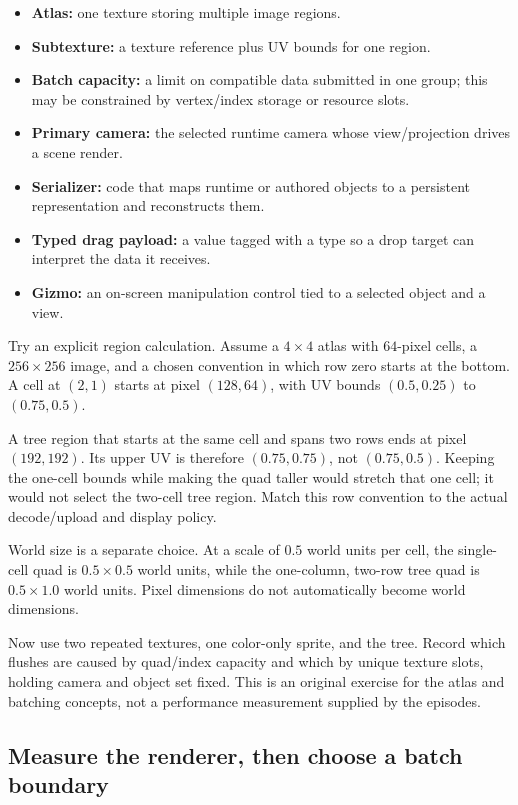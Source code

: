 \begin{itemize}
\tightlist
\item
  \textbf{Atlas:} one texture storing multiple image regions.
\item
  \textbf{Subtexture:} a texture reference plus UV bounds for one region.
\item
  \textbf{Batch capacity:} a limit on compatible data submitted in one group; this may be constrained by vertex/index storage or resource slots.
\item
  \textbf{Primary camera:} the selected runtime camera whose view/projection drives a scene render.
\item
  \textbf{Serializer:} code that maps runtime or authored objects to a persistent representation and reconstructs them.
\item
  \textbf{Typed drag payload:} a value tagged with a type so a drop target can interpret the data it receives.
\item
  \textbf{Gizmo:} an on-screen manipulation control tied to a selected object and a view.
\end{itemize}

Try an explicit region calculation. Assume a \(4\times4\) atlas with \(64\)-pixel cells, a \(256\times256\) image, and a chosen convention in which row zero starts at the bottom. A cell at \((2,1)\) starts at pixel \((128,64)\), with UV bounds \((0.5,0.25)\) to \((0.75,0.5)\).

A tree region that starts at the same cell and spans two rows ends at pixel \((192,192)\). Its upper UV is therefore \((0.75,0.75)\), not \((0.75,0.5)\). Keeping the one-cell bounds while making the quad taller would stretch that one cell; it would not select the two-cell tree region. Match this row convention to the actual decode/upload and display policy.

World size is a separate choice. At a scale of \(0.5\) world units per cell, the single-cell quad is \(0.5\times0.5\) world units, while the one-column, two-row tree quad is \(0.5\times1.0\) world units. Pixel dimensions do not automatically become world dimensions.

Now use two repeated textures, one color-only sprite, and the tree. Record which flushes are caused by quad/index capacity and which by unique texture slots, holding camera and object set fixed. This is an original exercise for the atlas and batching concepts, not a performance measurement supplied by the episodes.

\subsection{Measure the renderer, then choose a batch boundary}\label{06-engine-ii-ch026-measure-the-renderer-then-choose-a-batch-boundary}

